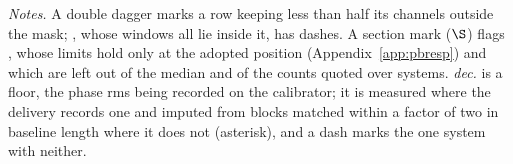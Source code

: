 \begin{table}
\centering
\caption{\textbf{Per-system sensitivity of the carrier search.} For each of
the \NSysClassA{} systems the fine-channel search covers, the
$\mathrm{EIRP}_{90}$ of its best window, retentions applied, in order of
the limit down the left half and then down the right half. Columns and
marks: Appendix~\ref{app:persys} and the notes below.}
\label{tab:persys}
\footnotesize


{\footnotesize\raggedright \emph{Notes.} A double dagger marks a row
keeping less than half its channels outside the mask; \NSysALostName, whose
\UmNWinALostWin{} windows all lie inside it, has dashes. A section mark
($\S$) flags \OmFlagStars, whose limits hold only at the adopted position
(Appendix~\ref{app:pbresp}) and which are left out of the median and of
the counts quoted over systems.
\emph{dec.} is a floor, the phase rms being recorded on the calibrator; it
is measured where the delivery records one and imputed from blocks matched
within a factor of two in baseline length where it does not (asterisk), and
a dash marks the one system with neither.\par}
\end{table}
